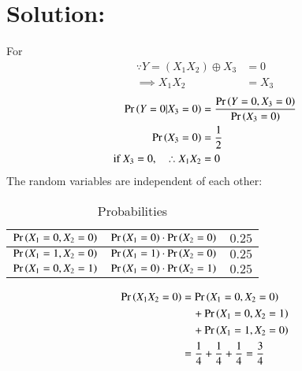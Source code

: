 \documentclass[journal,12pt,twocolumn]{IEEEtran}
\begin{document}
\section*{Solution:}
For
\begin{align}
    \because Y = (X_1X_2) \oplus X_3 &= 0\\
    \implies X_1X_2 &= X_3
\end{align}
\begin{align}
    \Pr\left(Y=0|X_3=0\right) &= \dfrac{\Pr\left(Y=0,X_3=0\right)}{\Pr\left(X_3=0\right)} \label{eq:0.0.1}\\
    \Pr\left(X_3 = 0\right) &= \frac{1}{2} \label{eq:0.0.2}\\
     \text{if } X_3 = 0,\quad \therefore X_1X_2 &= 0
\end{align}
The random variables are independent of each other:
\begin{table}[h!]
    \centering
    \resizebox{\columnwidth}{!}
    {
    \begin{tabular}{|c|c|c|}
    \hline
         $\Pr\left(X_1=0,X_2=0\right)$& $\Pr\left(X_1=0\right)\cdot\Pr\left(X_2=0\right)$&$0.25 $\\ \hline
         
         $\Pr\left(X_1=1,X_2=0\right)$&$\Pr\left(X_1=1\right)\cdot\Pr\left(X_2=0\right)$&$0.25$ \\  \hline
         $\Pr\left(X_1=0,X_2=1\right)$&$\Pr\left(X_1=0\right)\cdot\Pr\left(X_2=1\right)$&$0.25$\\
         \hline
    \end{tabular}
    }
    
    \caption{Probabilities }
    \label{tab:my_label}
\end{table}
\begin{align}
\nonumber
\Pr\left(X_1X_2=0\right) &= \Pr\left(X_1=0,X_2=0\right) \\ \nonumber
    &\quad+ \Pr\left(X_1=0,X_2=1\right)\\ &\quad+ \Pr\left(X_1=1,X_2=0\right)\\
    &=\frac{1}{4} +\frac{1}{4} + \frac{1}{4}= \frac{3}{4} 
\end{align}
\end{document}
